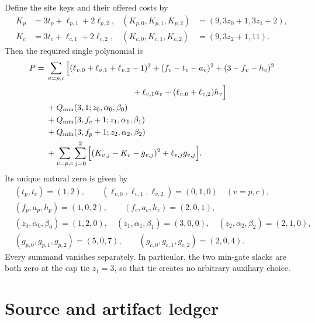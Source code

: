 \documentclass[11pt,letterpaper]{article}
\theoremstyle{definition}
\theoremstyle{remark}
\newcommand{\minpen}{Q_{\min}}
\begin{document}
Define the site keys and their offered costs by
\begin{align*}
 K_p&=3t_p+\ell_{p,1}+2\ell_{p,2},&
 (K_{p,0},K_{p,1},K_{p,2})&=(9,3z_0+1,3z_1+2),\\
 K_c&=3t_c+\ell_{c,1}+2\ell_{c,2},&
 (K_{c,0},K_{c,1},K_{c,2})&=(9,3z_2+1,11).
\end{align*}
Then the required single polynomial is
\begin{align*}
 P={}&\sum_{v=p,c}\Big[
 (\ell_{v,0}+\ell_{v,1}+\ell_{v,2}-1)^2
 +(f_v-t_v-a_v)^2+(3-f_v-h_v)^2\\
 &\hspace{37mm}+\ell_{v,1}a_v+(\ell_{v,0}+\ell_{v,2})h_v\Big]\\
 &+\minpen(3,1;z_0,\alpha_0,\beta_0)\\
 &+\minpen(3,f_c+1;z_1,\alpha_1,\beta_1)\\
 &+\minpen(3,f_p+1;z_2,\alpha_2,\beta_2)\\
 &+\sum_{v=p,c}\sum_{j=0}^2
 \Big[(K_{v,j}-K_v-g_{v,j})^2+\ell_{v,j}g_{v,j}\Big].
\end{align*}
Its unique natural zero is given by
\begin{align*}
 &(t_p,t_c)=(1,2),\qquad
 (\ell_{v,0},\ell_{v,1},\ell_{v,2})=(0,1,0)\quad(v=p,c),\\
 &(f_p,a_p,h_p)=(1,0,2),\qquad (f_c,a_c,h_c)=(2,0,1),\\
 &(z_0,\alpha_0,\beta_0)=(1,2,0),\quad
 (z_1,\alpha_1,\beta_1)=(3,0,0),\quad
 (z_2,\alpha_2,\beta_2)=(2,1,0),\\
 &(g_{p,0},g_{p,1},g_{p,2})=(5,0,7),\qquad
 (g_{c,0},g_{c,1},g_{c,2})=(2,0,4).
\end{align*}
Every summand vanishes separately. In particular, the two min-gate slacks
are both zero at the cap tie $z_1=3$, so that tie creates no arbitrary
auxiliary choice.

\section{Source and artifact ledger}\label{qoc:ts:app:ledger}
\end{document}
